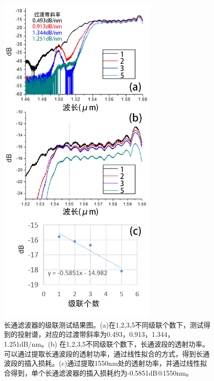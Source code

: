 \begin{figure}[!htbp]
    \centering
    \includegraphics[width=0.7\textwidth]{Img/5-11.png}
    \caption{长通滤波器的级联测试结果图。(a)在1,2,3,5不同级联个数下，测试得到的投射谱，对应的过渡带斜率为0.493，0.913，1.344，1.251dB/nm。(b) 在1,2,3,5不同级联个数下，长通波段的透射功率。可以通过提取长通波段的透射功率，通过线性拟合的方式，得到长通波段的插入损耗。(c)通过提取1550nm处的透射功率，并通过线性拟合得到，单个长通滤波器的插入损耗约为-0.5851dB@1550nm。}
    \label{fig:5-11}
\end{figure}

